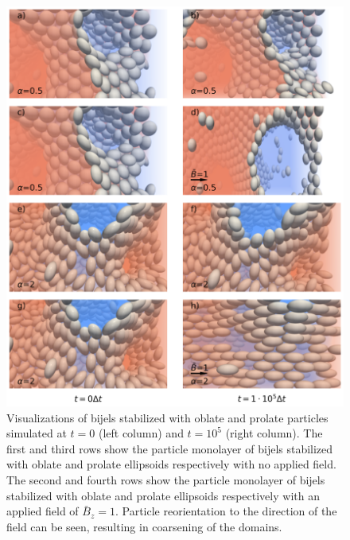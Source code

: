 \begin{figure} 
\centering 
\includegraphics[scale=0.2]{../figures/results/paper2/particle_viz-field_on.png} 
\caption{Visualizations of bijels stabilized with oblate and prolate particles simulated at $t = 0$ (left column) and $t = 10^5$ (right column). The first and third rows show the particle monolayer of bijels stabilized with oblate and prolate ellipsoids respectively with no applied field. The second and fourth rows show the particle monolayer of bijels stabilized with oblate and prolate ellipsoids respectively with an applied field of $\bar{B}_z = 1$. Particle reorientation to the direction of the field can be seen, resulting in coarsening of the domains.} 
\label{fig:particle_viz-field_on} 
\end{figure}


